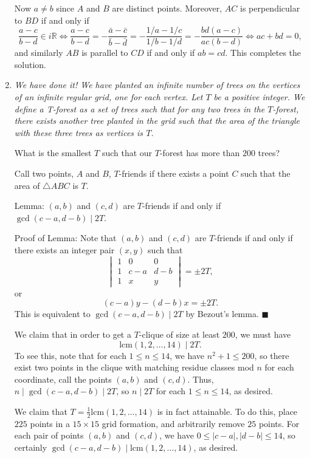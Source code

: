 \documentclass{article}
\begin{document}
\begin{enumerate}
Now $a \neq b$ since $A$ and $B$ are distinct points.
Moreover, $AC$ is perpendicular to $BD$ if and only if
\[ \frac{a-c}{b-d} \in i\mathbb{R} \iff \frac{a-c}{b-d} = -\frac{\bar{a}-\bar{c}}{\bar{b}-\bar{d}} = -\frac{1/a-1/c}{1/b-1/d} = -\frac{bd(a-c)}{ac(b-d)} \iff ac+bd = 0, \]
and similarly $AB$ is parallel to $CD$ if and only if $ab = cd$.
This completes the solution.


\medskip
\item %
{\itshape We have done it! We have planted an infinite number of trees on the vertices of an infinite regular grid, one for each vertex. Let $T$ be a positive integer. 
We define a {\itshape T-forest} as a set of trees such that for any two trees in the $T$-forest, there exists another tree planted in the grid such that the area of the triangle with these three trees as vertices is $T$.

What is the smallest $T$ such that our $T$-forest has more than $200$ trees?}

Call two points, $A$ and $B$, $T$-friends if there exists a point $C$ such that the area of $\triangle ABC$ is $T$.

Lemma: $(a,b)$ and $(c,d)$ are $T$-friends if and only if $\gcd(c-a,d-b)\mid 2T$.

Proof of Lemma: Note that $(a,b)$ and $(c,d)$ are $T$-friends if and only if there exists an integer pair $(x,y)$ such that
\[\begin{vmatrix}1 & 0 & 0 \\ 1 & c-a & d-b \\ 1 & x & y\end{vmatrix} = \pm 2T,\]or
\[(c-a)y-(d-b)x = \pm 2T.\]This is equivalent to $\gcd(c-a,d-b)\mid 2T$ by Bezout's lemma. $\blacksquare$

We claim that in order to get a $T$-clique of size at least $200$, we must have
\[\mathrm{lcm}(1,2,\ldots,14)\mid 2T.\]To see this, note that for each $1\le n\le 14$, we have $n^2+1\le 200$, so there exist two points in the clique with matching residue classes mod $n$ for each coordinate, call the points $(a,b)$ and $(c,d)$. Thus, $n\mid \gcd(c-a,d-b)\mid 2T$, so $n\mid 2T$ for each $1\le n\le 14$, as desired.

We claim that $T=\boxed{\frac{1}{2}\mathrm{lcm}(1,2,\ldots,14)}$ is in fact attainable. To do this, place $225$ points in a $15\times 15$ grid formation, and arbitrarily remove $25$ points. For each pair of points $(a,b)$ and $(c,d)$, we have $0\le|c-a|,|d-b|\le 14$, so certainly $\gcd(c-a,d-b)\mid \mathrm{lcm}(1,2,\ldots,14)$, as desired.




\end{enumerate}
\end{document}
